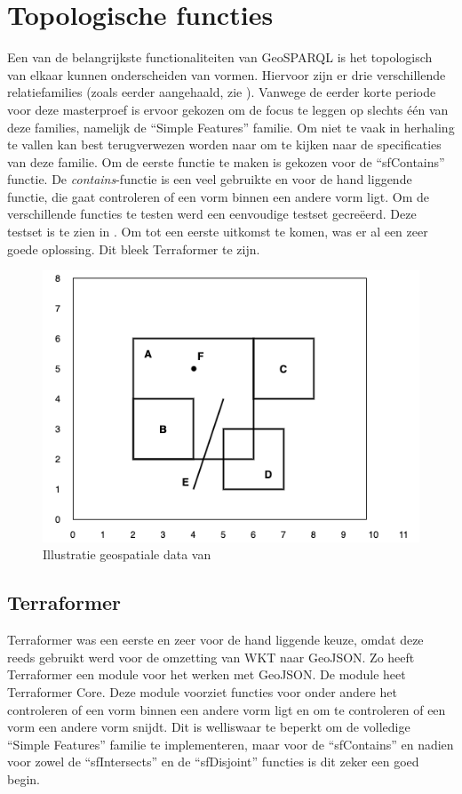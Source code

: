 \section{Topologische functies}
\label{sec:topologische_functies}
Een van de belangrijkste functionaliteiten van GeoSPARQL is het topologisch van elkaar kunnen onderscheiden van vormen. Hiervoor zijn er drie verschillende relatiefamilies (zoals eerder aangehaald, zie ). Vanwege de eerder korte periode voor deze masterproef is ervoor gekozen om de focus te leggen op slechts één van deze families, namelijk de ``Simple Features'' familie. Om niet te vaak in herhaling te vallen kan best terugverwezen worden naar  om te kijken naar de specificaties van deze familie. Om de eerste functie te maken is gekozen voor de ``sfContains'' functie. De \textit{contains}-functie is een veel gebruikte en voor de hand liggende functie, die gaat controleren of een vorm binnen een andere vorm ligt. Om de verschillende functies te testen werd een eenvoudige testset gecreëerd. Deze testset is te zien in . Om tot een eerste uitkomst te komen, was er al een zeer goede oplossing. Dit bleek Terraformer te zijn.

\begin{figure}[ht]
    \centering
    \includegraphics[width=0.5\linewidth]{images/geosparql_example.png}
    \caption{Illustratie geospatiale data van \cite{ogcdocs}}
    \label{fig:illustration_spatial_data}
\end{figure}

\subsection{Terraformer}
Terraformer was een eerste en zeer voor de hand liggende keuze, omdat deze reeds gebruikt werd voor de omzetting van WKT naar GeoJSON. Zo heeft Terraformer een module voor het werken met GeoJSON. De module heet Terraformer Core. Deze module voorziet functies voor onder andere het controleren of een vorm binnen een andere vorm ligt en om te controleren of een vorm een andere vorm snijdt. Dit is welliswaar te beperkt om de volledige ``Simple Features'' familie te implementeren, maar voor de ``sfContains'' en nadien voor zowel de ``sfIntersects'' en de ``sfDisjoint'' functies is dit zeker een goed begin. 


